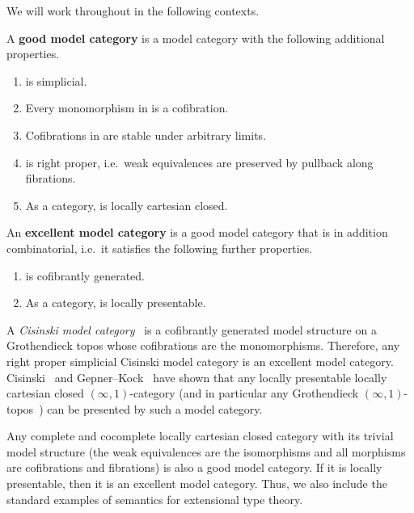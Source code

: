 \documentclass[referee]{psp}
\begin{document}
We will work throughout in the following contexts.

\begin{defn}
  A \textbf{good model category} is a model category \sM with the following additional properties.
  \begin{enumerate}
  \item \sM is simplicial.\label{item:m0}
  \item Every monomorphism in \sM is a cofibration.\label{item:m1}
  \item Cofibrations in \sM are stable under arbitrary limits.\label{item:m1a}
  \item \sM is right proper, i.e.\ weak equivalences are preserved by pullback along fibrations.\label{item:m2}
  \item As a category, \sM is locally cartesian closed.\label{item:m3}
  \end{enumerate}
  An \textbf{excellent model category} is a good model category that is in addition combinatorial, i.e.\ it satisfies the following further properties.
  \begin{enumerate}[resume]
  \item \sM is cofibrantly generated.
  \item As a category, \sM is locally presentable.
  \end{enumerate}
\end{defn}

\begin{eg}
A \emph{Cisinski model category}~\cite{cisinski:topos,cisinski:presheaves} is a cofibrantly generated model structure on a Grothendieck topos whose cofibrations are the monomorphisms.
Therefore, any right proper simplicial Cisinski model category is an excellent model category.
Cisinski~\cite{cisinski:lccc-rpcmc} and Gepner--Kock~\cite{gk:univlcc} have shown that any locally presentable locally cartesian closed $(\infty,1)$-category (and in particular any Grothendieck $(\infty,1)$-topos~\cite{lurie:higher-topoi}) can be presented by such a model category.
\end{eg}

\begin{eg}
Any complete and cocomplete locally cartesian closed category with its trivial model structure (the weak equivalences are the isomorphisms and all morphisms are cofibrations and fibrations) is also a good model category.
If it is locally presentable, then it is an excellent model category.
Thus, we also include the standard examples of semantics for extensional type theory.
\end{eg}
\end{document}
